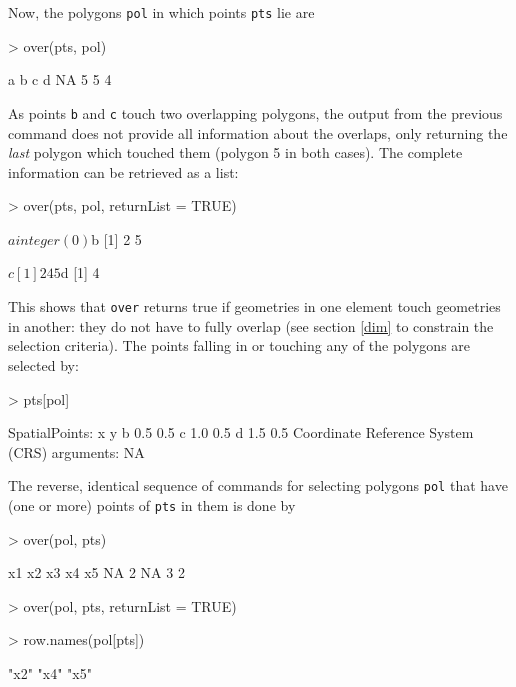 \documentclass{article}
\newcommand{\code}[1]{{\tt #1}}
\begin{document}
Now, the polygons \code{pol} in which points \code{pts} lie are
\begin{Schunk}
\begin{Sinput}
> over(pts, pol)
\end{Sinput}
\begin{Soutput}
 a  b  c  d 
NA  5  5  4 
\end{Soutput}
\end{Schunk}
As points \code{b} and \code{c} touch two overlapping polygons,
the output from the previous command does not provide all information
about the overlaps, only returning the \emph{last} polygon which touched
them (polygon 5 in both cases).
The complete information can be retrieved as a list:
\begin{Schunk}
\begin{Sinput}
> over(pts, pol, returnList = TRUE)
\end{Sinput}
\begin{Soutput}
$a
integer(0)

$b
[1] 2 5

$c
[1] 2 4 5

$d
[1] 4
\end{Soutput}
\end{Schunk}
This shows that \code{over} returns true if geometries in one element touch
geometries in another: they do not have to fully overlap
(see section \ref{dim} to constrain the selection criteria).
The points falling in or touching any of the polygons are selected by:
\begin{Schunk}
\begin{Sinput}
> pts[pol]
\end{Sinput}
\begin{Soutput}
SpatialPoints:
    x   y
b 0.5 0.5
c 1.0 0.5
d 1.5 0.5
Coordinate Reference System (CRS) arguments: NA 
\end{Soutput}
\end{Schunk}
The reverse, identical sequence of commands for 
selecting polygons \code{pol} that have 
(one or more) points of \code{pts} in them is done by
\begin{Schunk}
\begin{Sinput}
> over(pol, pts)
\end{Sinput}
\begin{Soutput}
x1 x2 x3 x4 x5 
NA  2 NA  3  2 
\end{Soutput}
\begin{Sinput}
> over(pol, pts, returnList = TRUE)
\end{Sinput}
\begin{Sinput}
> row.names(pol[pts])
\end{Sinput}
\begin{Soutput}
[1] "x2" "x4" "x5"
\end{Soutput}
\end{Schunk}
\end{document}
